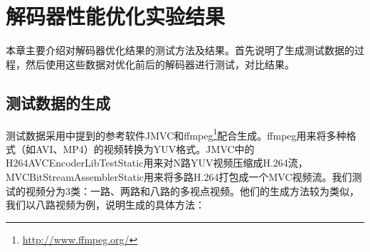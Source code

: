

\chapter{解码器性能优化实验结果}
\label{cha:optresultandanalysis}

本章主要介绍对解码器优化结果的测试方法及结果。首先说明了生成测试数据的过程，然后使用这些数据对优化前后的解码器进行测试，对比结果。

\section{测试数据的生成}
\label{sec:optresultsgeneration}

测试数据采用中提到的参考软件JMVC和ffmpeg\footnote{\url{http://www.ffmpeg.org/}}配合生成。ffmpeg用来将多种格式（如AVI、MP4）的视频转换为YUV格式。JMVC中的H264AVCEncoderLibTestStatic用来对N路YUV视频压缩成H.264流，MVCBitStreamAssemblerStatic用来将多路H.264打包成一个MVC视频流。我们测试的视频分为3类：一路、两路和八路的多视点视频。他们的生成方法较为类似，我们以八路视频为例，说明生成的具体方法：
